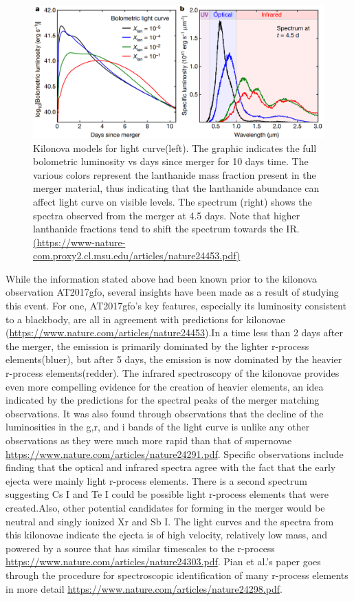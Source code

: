 \documentclass[11pt,a4paper]{article}
\begin{document}
\begin{figure}[h!]
  \includegraphics[width=1\textwidth]{kasen_curves.png}
  \caption{ Kilonova models for light curve(left). The graphic indicates the full bolometric luminosity vs days since merger for 10 days time. The various colors represent the lanthanide mass fraction present in the merger material, thus indicating that the lanthanide abundance can affect light curve on visible levels. The spectrum (right) shows the spectra observed from the merger at 4.5 days. Note that higher lanthanide fractions tend to shift the spectrum towards the IR. \url{(https://www-nature-com.proxy2.cl.msu.edu/articles/nature24453.pdf)} }
\end{figure}

While the information stated above had been known prior to the kilonova observation  AT2017gfo, several insights have been made as a result of studying this event. For one, AT2017gfo’s key features, especially its luminosity consistent to a blackbody, are all in agreement with predictions for kilonovae (\url{https://www.nature.com/articles/nature24453}).In a time less than 2 days after the merger, the emission is primarily dominated by the lighter r-process elements(bluer), but after 5 days, the emission is now dominated by the heavier r-process elements(redder). The infrared spectroscopy of the kilonovae provides even more compelling evidence for the creation of heavier elements, an idea indicated by the predictions for the spectral peaks of the merger matching observations. It was also found through observations that the decline of the luminosities in the g,r, and i bands of the light curve is unlike any other observations as they were much more rapid than that of supernovae \url{https://www.nature.com/articles/nature24291.pdf}. Specific observations include finding that the optical and infrared spectra agree with the fact that the early ejecta were mainly light r-process elements. There is a second spectrum suggesting Cs I and Te I could be possible light r-process elements that were created.Also, other potential candidates for forming in the merger would be neutral and singly ionized Xr and Sb I. The light curves and the spectra from this kilonovae indicate the ejecta is of high velocity, relatively low mass, and powered by a source that has similar timescales to the r-process \url{https://www.nature.com/articles/nature24303.pdf}. Pian et al.'s paper goes through the procedure for spectroscopic identification of many r-process elements in more detail \url{https://www.nature.com/articles/nature24298.pdf}.
\end{document}

